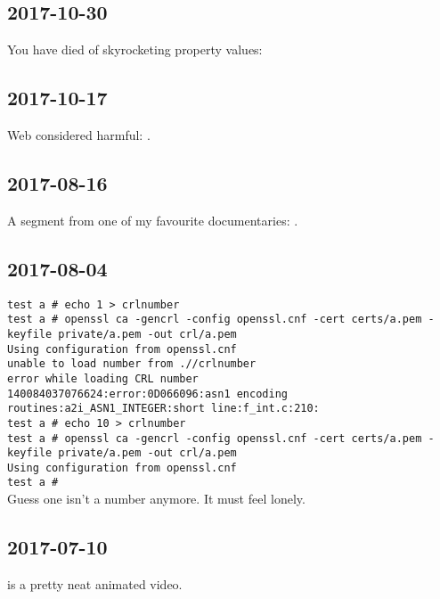 \documentclass{article}
\begin{document}
\subsection{2017-10-30}
You have died of skyrocketing property values: 

\subsection{2017-10-17}
Web considered harmful: .

\subsection{2017-08-16}
A segment from one of my favourite documentaries: .

\subsection{2017-08-04}
\texttt{test a # echo 1 > crlnumber \\
test a # openssl ca -gencrl -config openssl.cnf -cert certs/a.pem -keyfile private/a.pem -out crl/a.pem \\
Using configuration from openssl.cnf \\
unable to load number from .//crlnumber \\
error while loading CRL number \\
140084037076624:error:0D066096:asn1 encoding routines:a2i_ASN1_INTEGER:short line:f_int.c:210: \\
test a # echo 10 > crlnumber \\
test a # openssl ca -gencrl -config openssl.cnf -cert certs/a.pem -keyfile private/a.pem -out crl/a.pem \\
Using configuration from openssl.cnf \\
test a #} \\
Guess one isn't a number anymore.  It must feel lonely.

\subsection{2017-07-10}
 is a pretty neat animated video.
\end{document}
